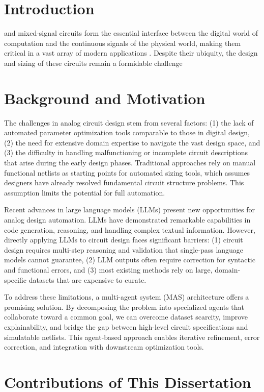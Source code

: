 \section{Introduction}

 and mixed-signal circuits form the essential interface between the digital world of computation and the continuous signals of the physical world, making them critical in a vast array of modern applications
. Despite their ubiquity, the design and sizing of these circuits remain a formidable challenge
\section{Background and Motivation}

The challenges in analog circuit design stem from several factors: (1) the lack of automated parameter optimization tools comparable to those in digital design, (2) the need for extensive domain expertise to navigate the vast design space, and (3) the difficulty in handling malfunctioning or incomplete circuit descriptions that arise during the early design phases. Traditional approaches rely on manual functional netlists as starting points for automated sizing tools, which assumes designers have already resolved fundamental circuit structure problems. This assumption limits the potential for full automation.

Recent advances in large language models (LLMs) present new opportunities for analog design automation. LLMs have demonstrated remarkable capabilities in code generation, reasoning, and handling complex textual information. However, directly applying LLMs to circuit design faces significant barriers: (1) circuit design requires multi-step reasoning and validation that single-pass language models cannot guarantee, (2) LLM outputs often require correction for syntactic and functional errors, and (3) most existing methods rely on large, domain-specific datasets that are expensive to curate.

To address these limitations, a multi-agent system (MAS) architecture offers a promising solution. By decomposing the problem into specialized agents that collaborate toward a common goal, we can overcome dataset scarcity, improve explainability, and bridge the gap between high-level circuit specifications and simulatable netlists. This agent-based approach enables iterative refinement, error correction, and integration with downstream optimization tools.

\section{Contributions of This Dissertation}

